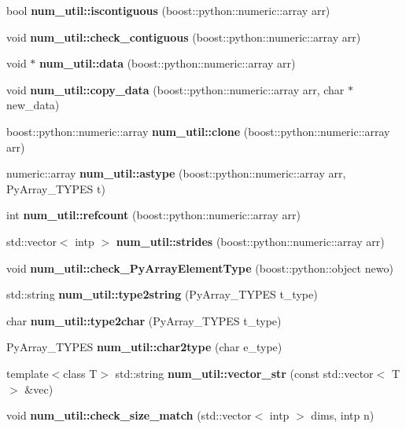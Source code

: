 \begin{CompactItemize}
\item 
bool {\bf num\_\-util::iscontiguous} (boost::python::numeric::array arr)
\item 
void {\bf num\_\-util::check\_\-contiguous} (boost::python::numeric::array arr)
\item 
void $\ast$ {\bf num\_\-util::data} (boost::python::numeric::array arr)
\item 
void {\bf num\_\-util::copy\_\-data} (boost::python::numeric::array arr, char $\ast$new\_\-data)
\item 
boost::python::numeric::array {\bf num\_\-util::clone} (boost::python::numeric::array arr)
\item 
numeric::array {\bf num\_\-util::astype} (boost::python::numeric::array arr, Py\-Array\_\-TYPES t)
\item 
int {\bf num\_\-util::refcount} (boost::python::numeric::array arr)
\item 
std::vector$<$ intp $>$ {\bf num\_\-util::strides} (boost::python::numeric::array arr)
\item 
void {\bf num\_\-util::check\_\-Py\-Array\-Element\-Type} (boost::python::object newo)
\item 
std::string {\bf num\_\-util::type2string} (Py\-Array\_\-TYPES t\_\-type)
\item 
char {\bf num\_\-util::type2char} (Py\-Array\_\-TYPES t\_\-type)
\item 
Py\-Array\_\-TYPES {\bf num\_\-util::char2type} (char e\_\-type)
\item 
template$<$class T$>$ std::string {\bf num\_\-util::vector\_\-str} (const std::vector$<$ T $>$ \&vec)
\item 
void {\bf num\_\-util::check\_\-size\_\-match} (std::vector$<$ intp $>$ dims, intp n)
\end{CompactItemize}
